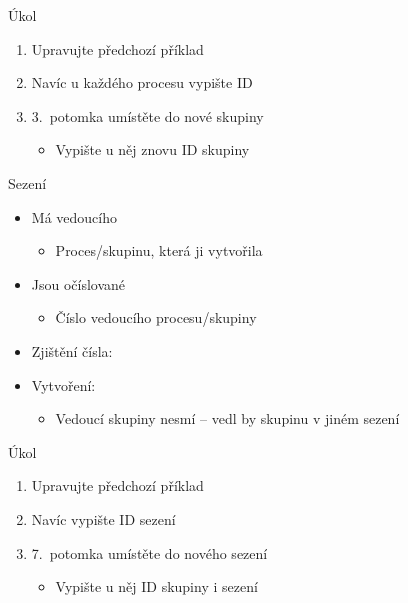 \begin{frame}{Úkol}

  \begin{enumerate}
    \item Upravujte předchozí příklad
    \item Navíc u každého procesu vypište ID
    \item 3.\ potomka umístěte do nové skupiny
    \begin{itemize}
      \item Vypište u něj znovu ID skupiny
    \end{itemize}
  \end{enumerate}

\end{frame}

\begin{frame}{Sezení}

  \begin{itemize}
    \item Má vedoucího
    \begin{itemize}
      \item Proces/skupinu, která ji vytvořila
    \end{itemize}

    \pause

    \item Jsou očíslované
    \begin{itemize}
      \item Číslo vedoucího procesu/skupiny
    \end{itemize}

    \pause

    \item Zjištění čísla: 
    \item Vytvoření: 
    \begin{itemize}
      \item Vedoucí skupiny nesmí -- vedl by skupinu v jiném sezení
    \end{itemize}
  \end{itemize}

\end{frame}

\begin{frame}{Úkol}

  \begin{enumerate}
    \item Upravujte předchozí příklad
    \item Navíc vypište ID sezení
    \item 7.\ potomka umístěte do nového sezení
    \begin{itemize}
      \item Vypište u něj ID skupiny i sezení
    \end{itemize}
  \end{enumerate}

\end{frame}

